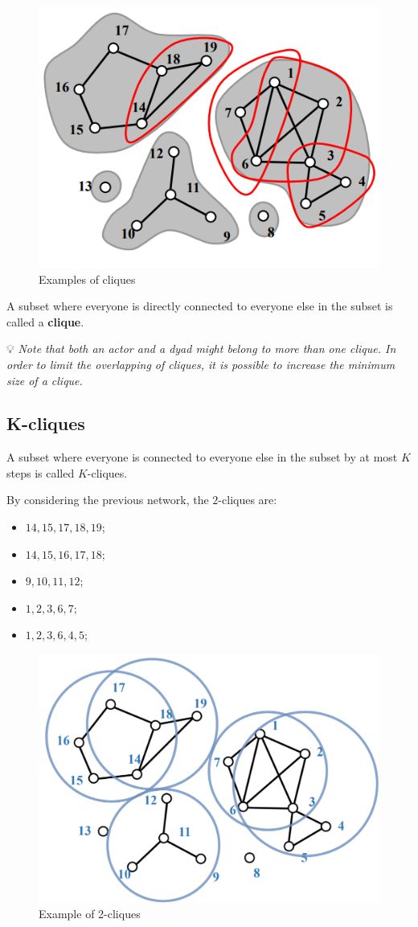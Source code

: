 \documentclass[
  notitlepage,
  onecolumn,
  openany]{book}
\providecommand{\tightlist}{%
  \setlength{\itemsep}{0pt}\setlength{\parskip}{0pt}}
\begin{document}
\begin{figure}[h!]

{\centering \includegraphics[width=0.5\linewidth]{images/11-Subgroups and Structural Equivalence/Untitled 1} 

}

\caption{Examples of cliques}\label{fig:unnamed-chunk-81}
\end{figure}

A subset where everyone is directly connected to everyone else in the subset is called a \textbf{clique}.

💡 \emph{Note that both an actor and a dyad might belong to more than one clique. In order to limit the overlapping of cliques, it is possible to increase the minimum size of a clique.}

\hypertarget{k-cliques}{%
\subsection{K-cliques}\label{k-cliques}}

A subset where everyone is connected to everyone else in the subset by at most \(K\) steps is called \(K\)-cliques.

By considering the previous network, the \(2\)-cliques are:

\begin{itemize}
\tightlist
\item
  \(14, 15, 17, 18, 19\);
\item
  \(14, 15, 16, 17, 18\);
\item
  \(9, 10, 11, 12\);
\item
  \(1, 2, 3, 6, 7\);
\item
  \(1, 2, 3, 6, 4, 5\);
\end{itemize}

\begin{figure}[h!]

{\centering \includegraphics[width=0.5\linewidth]{images/11-Subgroups and Structural Equivalence/12-network} 

}

\caption{Example of 2-cliques}\label{fig:unnamed-chunk-82}
\end{figure}
\end{document}
